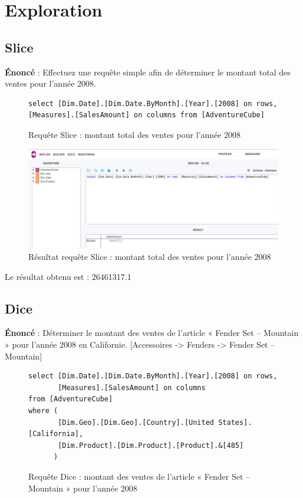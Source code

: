 \chapter{Exploration}

\section{Slice}

\textbf{Énoncé} : Effectuez une requête simple afin de déterminer le montant total des ventes pour l’année 2008.

\begin{figure}[H]
\centering
\begin{lstlisting}
select [Dim.Date].[Dim.Date.ByMonth].[Year].[2008] on rows,
[Measures].[SalesAmount] on columns from [AdventureCube]
\end{lstlisting}
\caption{Requête Slice : montant total des ventes pour l'année 2008}
\label{lst:reqSlice}
\end{figure}

\begin{figure}[H]
    \centering
    \includegraphics[width=1\linewidth, fbox]{img/requeteSlice.png}
    \caption{Résultat requête Slice : montant total des ventes pour l'année 2008}
    \label{reqSliceResult}
\end{figure}

Le résultat obtenu est : 26461317.1

\pagebreak

\section{Dice}

\textbf{Énoncé} : Déterminer le montant des ventes de l’article « Fender Set – Mountain » pour l’année 2008 en Californie. [Accessoires -> Fenders -> Fender Set – Mountain]

\begin{figure}[H]
\centering
\begin{lstlisting}
select [Dim.Date].[Dim.Date.ByMonth].[Year].[2008] on rows,
	   [Measures].[SalesAmount] on columns
from [AdventureCube]
where (
	   [Dim.Geo].[Dim.Geo].[Country].[United States].[California],
	   [Dim.Product].[Dim.Product].[Product].&[485]
      )
\end{lstlisting}
\caption{Requête Dice : montant des ventes de l'article « Fender Set – Mountain » pour l'année 2008}
\label{lst:reqDice}
\end{figure}


